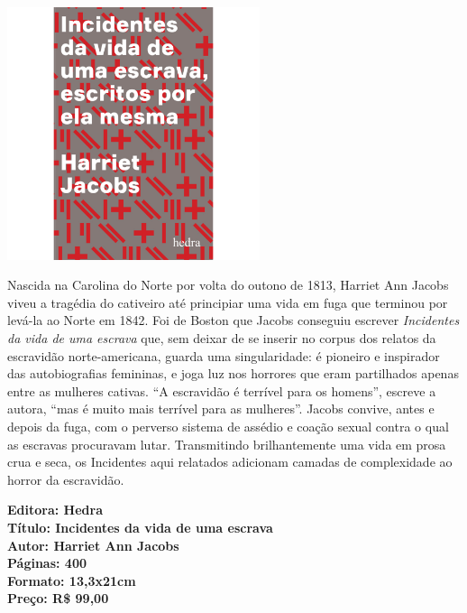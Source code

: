 \pagebreak

\begin{center}
\hspace*{-3.6cm}
\hspace*{3.1cm}\includegraphics[width=74mm]{./grid/harriet.png}
\end{center}

\hspace*{-7cm}\hrulefill\hspace*{-7cm}

\medskip

\noindent{}Nascida na Carolina do Norte por volta do outono de 1813, Harriet Ann Jacobs viveu a tragédia do cativeiro até principiar uma vida em fuga que terminou por levá-la ao Norte em 1842. Foi de Boston que Jacobs conseguiu escrever \textit{Incidentes da vida de uma escrava} que, sem deixar de se inserir no corpus dos relatos da escravidão norte-americana, guarda uma singularidade: é pioneiro e inspirador das autobiografias femininas, e joga luz nos horrores que eram partilhados apenas entre as mulheres cativas.
``A escravidão é terrível para os homens'', escreve a autora, ``mas é muito mais terrível para as mulheres''. Jacobs convive, antes e depois da fuga, com o perverso sistema de assédio e coação sexual contra o qual as escravas procuravam lutar. Transmitindo brilhantemente uma vida em prosa crua e seca, os Incidentes aqui relatados adicionam camadas de complexidade ao horror da escravidão.

\vfill

\noindent\begin{minipage}[c]{1\linewidth}
{\small\textbf{
\hspace*{-.1cm}Editora: Hedra\\
Título: Incidentes da vida de uma escrava\\
Autor: Harriet Ann Jacobs\\ 
Páginas: 400\\
Formato: 13,3x21cm\\
Preço: R\$ 99,00\\
}}
\end{minipage}

